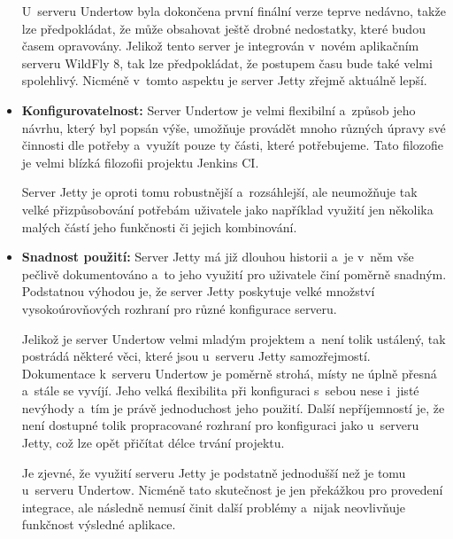 \begin{itemize}
{                        U~serveru Undertow byla dokončena první finální verze teprve nedávno,
                        takže lze předpokládat, že může obsahovat ještě drobné nedostatky,
                        které budou časem opravovány. Jelikož tento server je integrován
                        v~novém aplikačním serveru WildFly 8, tak lze předpokládat,
                        že postupem času bude také velmi spolehlivý. 
                        Nicméně v~tomto aspektu je server Jetty zřejmě 
                        aktuálně lepší.}

                \item{\textbf{Konfigurovatelnost:} Server Undertow je velmi flexibilní a~způsob
                    jeho návrhu, který byl popsán výše, umožňuje provádět mnoho různých úpravy 
                    své činnosti dle potřeby a~využít pouze ty části, které potřebujeme.
                    Tato filozofie je velmi blízká filozofii projektu Jenkins CI. 
                    
                    Server Jetty
                    je oproti tomu robustnější a~rozsáhlejší, ale neumožňuje tak velké přizpůsobování potřebám
                    uživatele jako například využití jen několika malých částí jeho funkčnosti či jejich
                    kombinování. }


                \item{\textbf{Snadnost použití:}}                      
                    Server Jetty má již dlouhou historii a~je v~něm vše pečlivě dokumentováno
                    a~to jeho využití pro uživatele činí poměrně snadným. Podstatnou výhodou je, že
                    server Jetty poskytuje velké množství vysokoúrovňových rozhraní
                    pro různé konfigurace serveru.
                    
                    Jelikož je server Undertow velmi mladým projektem a~není tolik ustálený, 
                    tak postrádá některé věci,
                    které jsou u~serveru Jetty samozřejmostí. 
                    Dokumentace k~serveru
                    Undertow je poměrně strohá, místy ne úplně přesná a~stále se vyvíjí. 
                    Jeho velká flexibilita při konfiguraci s~sebou nese i~jisté nevýhody
                    a~tím je právě jednoduchost jeho použití. Další nepříjemností je, že není
                    dostupné tolik propracované rozhraní pro konfiguraci jako u~serveru Jetty,
                    což lze opět přičítat délce trvání projektu.

                    Je zjevné, že využití serveru Jetty je podstatně jednodušší než je tomu
                    u~serveru Undertow. Nicméně tato skutečnost je jen překážkou pro provedení
                    integrace, ale následně nemusí činit další problémy a~nijak neovlivňuje
                    funkčnost výsledné aplikace.

            \end{itemize}
        

